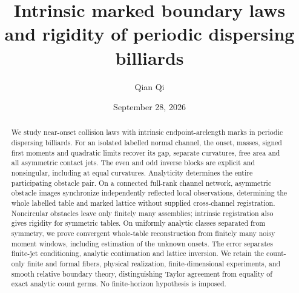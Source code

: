 \documentclass[11pt]{amsart}
\title[Intrinsic marked boundary laws]{Intrinsic marked boundary laws and rigidity of periodic dispersing billiards}
\author{Qian Qi}
\date{September 28, 2026}
\theoremstyle{definition}\newtheorem{definition}[theorem]{Definition}
\theoremstyle{remark}\newtheorem{remark}[theorem]{Remark}
\numberwithin{equation}{section}
\begin{document}
\begin{abstract}
We study near-onset collision laws with intrinsic endpoint-arclength
marks in periodic dispersing billiards. For an isolated labelled normal
channel, the onset, masses, signed first moments and quadratic limits
recover its gap, separate curvatures, free area and all asymmetric contact
jets. The even and odd inverse blocks are explicit and nonsingular,
including at equal curvatures. Analyticity determines the entire
participating obstacle pair. On a connected full-rank channel network,
asymmetric obstacle images synchronize independently reflected local
observations, determining the whole labelled table and marked lattice
without supplied cross-channel registration. Noncircular obstacles leave
only finitely many assemblies; intrinsic registration also gives rigidity
for symmetric tables. On uniformly analytic classes separated from
symmetry, we prove convergent whole-table reconstruction from finitely
many noisy moment windows, including estimation of the unknown onsets.
The error separates finite-jet conditioning, analytic continuation and
lattice inversion. We retain the count-only finite and formal fibers,
physical realization, finite-dimensional experiments, and smooth relative
boundary theory, distinguishing Taylor agreement from equality of exact
analytic count germs. No finite-horizon hypothesis is imposed.
\end{abstract}
\maketitle












\end{document}
